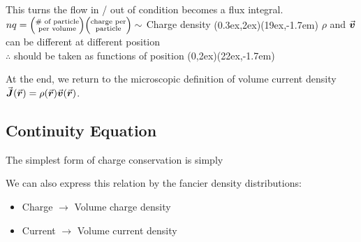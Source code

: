 \documentclass[class=article, crop=false, 12pt]{standalone}
\begin{document}
\begin{enumerate}

    This turns the flow in / out of condition becomes a flux integral.
    {\scriptsize $nq =\qty(\substack{\text{\# of particle}\\\text{per volume}})\qty(\substack{\text{charge per}\\\text{particle}})\sim $ Charge density}
    {(0.3ex,2ex)}{(19ex,-1.7em)}
    {\scriptsize $\rho$ and $\va*{v}$ can be different at different position\\[-1ex]\scriptsize $\therefore$ should be taken as functions of position}
    {(0,2ex)}{(22ex,-1.7em)}

    At the end, 
    we return to the microscopic definition of volume current density 
    $\va*{J}(\va*{r}) = \rho(\va*{r})\va*{v}(\va*{r})$. 
\end{enumerate}


\subsection{Continuity Equation}

The simplest form of charge conservation is simply

We can also express this relation by the fancier density distributions:
\begin{itemize}
    \item Charge $\rightarrow$ Volume charge density
    \item Current $\rightarrow$ Volume current density
\end{itemize}
\end{document}
